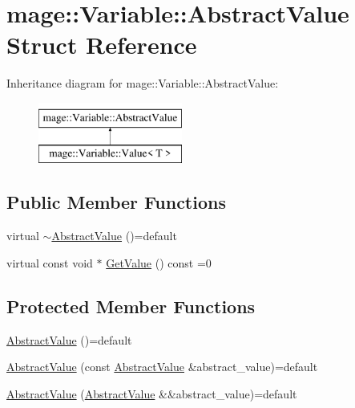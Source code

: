 \hypertarget{structmage_1_1_variable_1_1_abstract_value}{}\section{mage\+:\+:Variable\+:\+:Abstract\+Value Struct Reference}
\label{structmage_1_1_variable_1_1_abstract_value}
Inheritance diagram for mage\+:\+:Variable\+:\+:Abstract\+Value\+:\begin{figure}[H]
\begin{center}
\leavevmode
\includegraphics[height=2.000000cm]{structmage_1_1_variable_1_1_abstract_value}
\end{center}
\end{figure}
\subsection*{Public Member Functions}
\begin{DoxyCompactItemize}
\item 
virtual \hyperlink{structmage_1_1_variable_1_1_abstract_value_a7fa8fc14f81bb26f239af5f1263888a5}{$\sim$\+Abstract\+Value} ()=default
\item 
virtual const void $\ast$ \hyperlink{structmage_1_1_variable_1_1_abstract_value_aede2a77b571b80794a4254e34144f4c1}{Get\+Value} () const =0
\end{DoxyCompactItemize}
\subsection*{Protected Member Functions}
\begin{DoxyCompactItemize}
\item 
\hyperlink{structmage_1_1_variable_1_1_abstract_value_a0a96662d36697af8a17b88f6a2d8efca}{Abstract\+Value} ()=default
\item 
\hyperlink{structmage_1_1_variable_1_1_abstract_value_a09123ab568948a1a8bc7911c65fda422}{Abstract\+Value} (const \hyperlink{structmage_1_1_variable_1_1_abstract_value}{Abstract\+Value} \&abstract\+\_\+value)=default
\item 
\hyperlink{structmage_1_1_variable_1_1_abstract_value_af2decac4e5b5b52c3e6973b39a2dec5b}{Abstract\+Value} (\hyperlink{structmage_1_1_variable_1_1_abstract_value}{Abstract\+Value} \&\&abstract\+\_\+value)=default
\end{DoxyCompactItemize}
